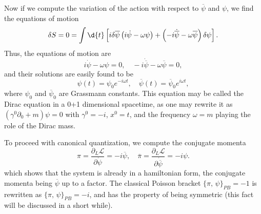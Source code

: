 Now if we compute the variation of the action with respect to \(\overline{\psi}\) and \(\psi\), we find the equations of motion
\[
    \delta S = 0 = \int \d{t} \left[ i \delta \overline{\psi} \left( i \dot{\psi} - \omega \psi\right) + \left(- i \dot{\overline{\psi}} - \omega \overline{\psi}\right) \delta \psi \right].
\]
Thus, the equations of motion are
\begin{equation}
    i \dot{\psi} - \omega \psi = 0, \quad - i \dot{\overline{\psi}} - \omega \overline{\psi} = 0,
    \label{eq:fermionic_oscillator_eom}
\end{equation}
and their solutions are easily found to be
\begin{equation}
    \psi(t) = \psi_0 e^{-i \omega t}, \quad \overline{\psi}(t) = \overline{\psi}_0 e^{i \omega t},
    \label{eq:fermionic_oscillator_solutions}
\end{equation}
where \(\psi_0\) and \(\overline{\psi}_0\) are Grassmann constants. This equation may be called the Dirac equation in a 0+1 dimensional spacetime, as one may rewrite it as \((\gamma^0 \partial_0 + m )\psi = 0\) with \(\gamma^0 = -i\), \(x^0 = t\), and the frequency \(\omega = m\) playing the role of the Dirac mass.

To proceed with canonical quantization, we compute the conjugate momenta
\begin{equation}
    \pi = \frac{\partial_L \mathcal{L}}{\partial \dot{\psi}} = - i \overline{\psi}, \quad \overline{\pi} = \frac{\partial_L \mathcal{L}}{\partial \dot{\overline{\psi}}} = - i \psi.
    \label{eq:conjugate_momenta_fermionic_oscillator}
\end{equation}
which shows that the system is already in a hamiltonian form, the conjugate momenta being \(\overline{\psi}\) up to a factor. The classical Poisson bracket \(\{\pi,\,\psi\}_{PB} = -1\) is rewritten as \(\{\pi,\,\psi\}_{PB} = -i\), and has the property of being symmetric (this fact will be discussed in a short while).

